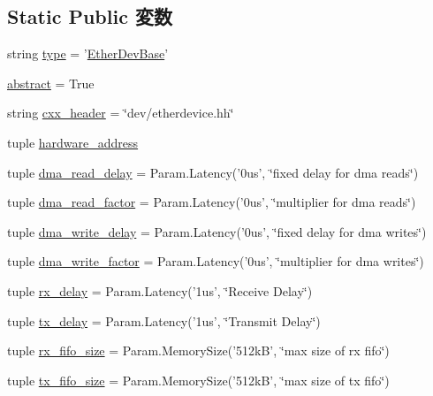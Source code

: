 \subsection*{Static Public 変数}
\begin{DoxyCompactItemize}
\item 
string \hyperlink{classEthernet_1_1EtherDevBase_acce15679d830831b0bbe8ebc2a60b2ca}{type} = '\hyperlink{classEthernet_1_1EtherDevBase}{EtherDevBase}'
\item 
\hyperlink{classEthernet_1_1EtherDevBase_a17fa61ac3806b481cafee5593b55e5d0}{abstract} = True
\item 
string \hyperlink{classEthernet_1_1EtherDevBase_a17da7064bc5c518791f0c891eff05fda}{cxx\_\-header} = \char`\"{}dev/etherdevice.hh\char`\"{}
\item 
tuple \hyperlink{classEthernet_1_1EtherDevBase_a0a01a2a0083560db04121eeee8c8e9fe}{hardware\_\-address}
\item 
tuple \hyperlink{classEthernet_1_1EtherDevBase_ae1796dfc751bce0b1ed6f89fe1f18f74}{dma\_\-read\_\-delay} = Param.Latency('0us', \char`\"{}fixed delay for dma reads\char`\"{})
\item 
tuple \hyperlink{classEthernet_1_1EtherDevBase_a9447bf3b5b6f66d9835e219b5cead65c}{dma\_\-read\_\-factor} = Param.Latency('0us', \char`\"{}multiplier for dma reads\char`\"{})
\item 
tuple \hyperlink{classEthernet_1_1EtherDevBase_a9d3ab02a832357b6fb582d9cefbb1ccd}{dma\_\-write\_\-delay} = Param.Latency('0us', \char`\"{}fixed delay for dma writes\char`\"{})
\item 
tuple \hyperlink{classEthernet_1_1EtherDevBase_ab089378f86c775ef8dd0105bc8f9b41a}{dma\_\-write\_\-factor} = Param.Latency('0us', \char`\"{}multiplier for dma writes\char`\"{})
\item 
tuple \hyperlink{classEthernet_1_1EtherDevBase_aac27cf5563d0189f7f60a444745c50c3}{rx\_\-delay} = Param.Latency('1us', \char`\"{}Receive Delay\char`\"{})
\item 
tuple \hyperlink{classEthernet_1_1EtherDevBase_a92a53dd964a9a188a986bd77a968c268}{tx\_\-delay} = Param.Latency('1us', \char`\"{}Transmit Delay\char`\"{})
\item 
tuple \hyperlink{classEthernet_1_1EtherDevBase_a4b48836aef9c8017ad618a4a50417609}{rx\_\-fifo\_\-size} = Param.MemorySize('512kB', \char`\"{}max size of rx fifo\char`\"{})
\item 
tuple \hyperlink{classEthernet_1_1EtherDevBase_ade05cdf962b2bfb207d5c864432949b8}{tx\_\-fifo\_\-size} = Param.MemorySize('512kB', \char`\"{}max size of tx fifo\char`\"{})

\end{DoxyCompactItemize}
